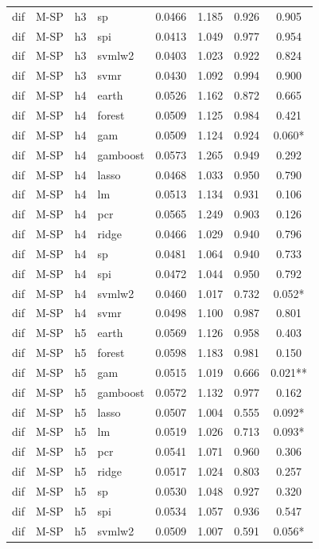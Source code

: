 \begin{ThreePartTable}
\begin{longtable}[t]{llclcccc}
dif & M-SP & h3 & sp & 0.0466 & 1.185 & 0.926 & 0.905\\
dif & M-SP & h3 & spi & 0.0413 & 1.049 & 0.977 & 0.954\\
dif & M-SP & h3 & svmlw2 & 0.0403 & 1.023 & 0.922 & 0.824\\
dif & M-SP & h3 & svmr & 0.0430 & 1.092 & 0.994 & 0.900\\
\addlinespace
dif & M-SP & h4 & earth & 0.0526 & 1.162 & 0.872 & 0.665\\
dif & M-SP & h4 & forest & 0.0509 & 1.125 & 0.984 & 0.421\\
dif & M-SP & h4 & gam & 0.0509 & 1.124 & 0.924 & 0.060*\\
dif & M-SP & h4 & gamboost & 0.0573 & 1.265 & 0.949 & 0.292\\
dif & M-SP & h4 & lasso & 0.0468 & 1.033 & 0.950 & 0.790\\
dif & M-SP & h4 & lm & 0.0513 & 1.134 & 0.931 & 0.106\\
dif & M-SP & h4 & pcr & 0.0565 & 1.249 & 0.903 & 0.126\\
dif & M-SP & h4 & ridge & 0.0466 & 1.029 & 0.940 & 0.796\\
dif & M-SP & h4 & sp & 0.0481 & 1.064 & 0.940 & 0.733\\
dif & M-SP & h4 & spi & 0.0472 & 1.044 & 0.950 & 0.792\\
dif & M-SP & h4 & svmlw2 & 0.0460 & 1.017 & 0.732 & 0.052*\\
dif & M-SP & h4 & svmr & 0.0498 & 1.100 & 0.987 & 0.801\\
\addlinespace
dif & M-SP & h5 & earth & 0.0569 & 1.126 & 0.958 & 0.403\\
dif & M-SP & h5 & forest & 0.0598 & 1.183 & 0.981 & 0.150\\
dif & M-SP & h5 & gam & 0.0515 & 1.019 & 0.666 & 0.021**\\
dif & M-SP & h5 & gamboost & 0.0572 & 1.132 & 0.977 & 0.162\\
dif & M-SP & h5 & lasso & 0.0507 & 1.004 & 0.555 & 0.092*\\
dif & M-SP & h5 & lm & 0.0519 & 1.026 & 0.713 & 0.093*\\
dif & M-SP & h5 & pcr & 0.0541 & 1.071 & 0.960 & 0.306\\
dif & M-SP & h5 & ridge & 0.0517 & 1.024 & 0.803 & 0.257\\
dif & M-SP & h5 & sp & 0.0530 & 1.048 & 0.927 & 0.320\\
dif & M-SP & h5 & spi & 0.0534 & 1.057 & 0.936 & 0.547\\
dif & M-SP & h5 & svmlw2 & 0.0509 & 1.007 & 0.591 & 0.056*\\

\end{longtable}
\end{ThreePartTable}
